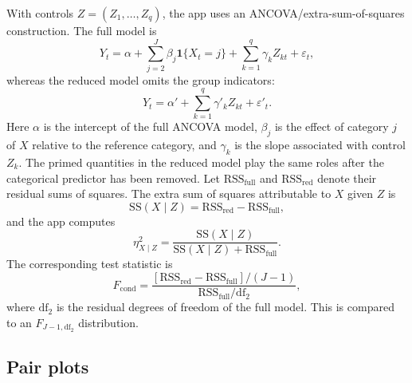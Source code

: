 \documentclass[11pt]{article}
\begin{document}
\begin{appendix}
With controls $Z = (Z_1, \dots, Z_q)$, the app uses an
ANCOVA/extra-sum-of-squares construction. The full model is
\begin{equation}
Y_t
=
\alpha
+ \sum_{j=2}^{J} \beta_j \mathbf{1}\{X_t = j\}
+ \sum_{k=1}^{q} \gamma_k Z_{kt}
+ \varepsilon_t,
\label{eq:app-full-ancova}
\end{equation}
whereas the reduced model omits the group indicators:
\begin{equation}
Y_t
=
\alpha'
+ \sum_{k=1}^{q} \gamma'_k Z_{kt}
+ \varepsilon'_t.
\label{eq:app-red-ancova}
\end{equation}
Here $\alpha$ is the intercept of the full ANCOVA model, $\beta_j$ is the
effect of category $j$ of $X$ relative to the reference category, and
$\gamma_k$ is the slope associated with control $Z_k$. The primed quantities
in the reduced model play the same roles after the categorical predictor has
been removed.
Let $\mathrm{RSS}_{\mathrm{full}}$ and $\mathrm{RSS}_{\mathrm{red}}$ denote
their residual sums of squares. The extra sum of squares attributable to $X$
given $Z$ is
\begin{equation}
\mathrm{SS}(X \mid Z)
=
\mathrm{RSS}_{\mathrm{red}} - \mathrm{RSS}_{\mathrm{full}},
\label{eq:app-ssxz}
\end{equation}
and the app computes
\begin{equation}
\eta^2_{X\mid Z}
=
\frac{\mathrm{SS}(X \mid Z)}
{\mathrm{SS}(X \mid Z) + \mathrm{RSS}_{\mathrm{full}}}.
\label{eq:app-partial-eta2}
\end{equation}
The corresponding test statistic is
\begin{equation}
F_{\mathrm{cond}}
=
\frac{[\mathrm{RSS}_{\mathrm{red}} - \mathrm{RSS}_{\mathrm{full}}]/(J-1)}
{\mathrm{RSS}_{\mathrm{full}}/\mathrm{df}_2},
\label{eq:app-ancova-f}
\end{equation}
where $\mathrm{df}_2$ is the residual degrees of freedom of the full model.
This is compared to an $F_{J-1,\mathrm{df}_2}$ distribution.

\subsection{Pair plots}


\end{appendix}
\end{document}
